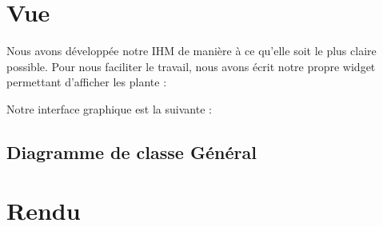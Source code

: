 \documentclass[a4paper,10pt]{article}
\begin{document}
\section{Vue}

Nous avons développée notre IHM de manière à ce qu'elle soit le plus claire possible.
Pour nous faciliter le travail, nous avons écrit notre propre widget permettant d'afficher les plante :

Notre interface graphique est la suivante :
\subsection{Diagramme de classe Général}
\section{Rendu}
\end{document}
